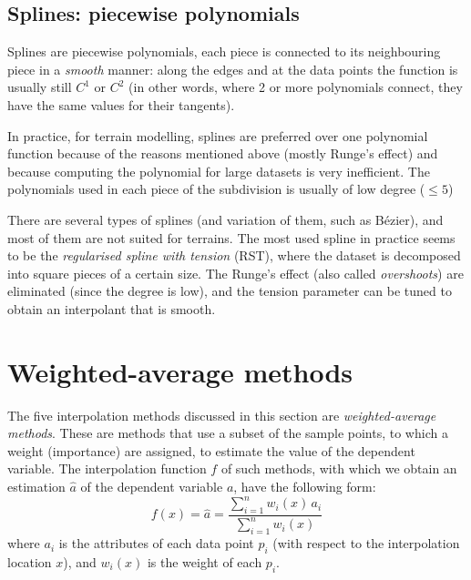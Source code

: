 %
\subsection{Splines: piecewise polynomials}%

Splines are piecewise polynomials, each piece is connected to its neighbouring piece in a \emph{smooth} manner: along the edges and at the data points the function is usually still $C^1$ or $C^2$ (in other words, where 2 or more polynomials connect, they have the same values for their tangents).

In practice, for terrain modelling, splines are preferred over one polynomial function because of the reasons mentioned above (mostly Runge's effect) and because computing the polynomial for large datasets is very inefficient.
The polynomials used in each piece of the subdivision is usually of low degree ($\leq 5$)

%

There are several types of splines (and variation of them, such as Bézier), and most of them are not suited for terrains.
The most used spline in practice seems to be the \emph{regularised spline with tension} (RST), where the dataset is decomposed into square pieces of a certain size.
The Runge's effect (also called \emph{overshoots}) are eliminated (since the degree is low), and the tension parameter can be tuned to obtain an interpolant that is smooth.




\section{Weighted-average methods}

The five interpolation methods discussed in this section are \emph{weighted-average methods}.
These are methods that use a subset of the sample points, to which a weight (importance) are assigned, to estimate the value of the dependent variable. 
The interpolation function $f$ of such methods, with which we obtain an estimation $\hat{a}$ of the dependent variable $a$, have the following form:
\begin{equation}
  f(x) = \hat{a} = \frac{\sum_{i=1}^n w_{i}(x) \, a_{i}}{\sum_{i=1}^{n} w_{i}(x)}
  \label{eq:wai}
\end{equation}
where $a_i$ is the attributes of each data point $p_i$ (with respect to the interpolation location $x$), and $w_{i}(x)$ is the weight of each $p_i$. 

